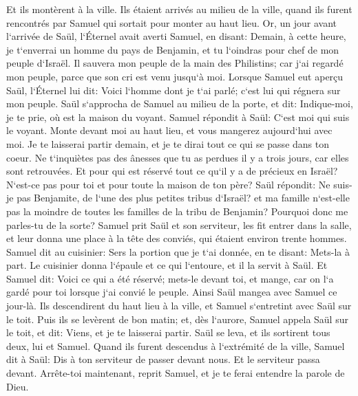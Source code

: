 \verse Et ils montèrent à la ville. Ils étaient arrivés au milieu de la ville, quand ils furent rencontrés par Samuel qui sortait pour monter au haut lieu. 
\verse Or, un jour avant l`arrivée de Saül, l`Éternel avait averti Samuel, en disant: 
\verse Demain, à cette heure, je t`enverrai un homme du pays de Benjamin, et tu l`oindras pour chef de mon peuple d`Israël. Il sauvera mon peuple de la main des Philistins; car j`ai regardé mon peuple, parce que son cri est venu jusqu`à moi. 
\verse Lorsque Samuel eut aperçu Saül, l`Éternel lui dit: Voici l`homme dont je t`ai parlé; c`est lui qui régnera sur mon peuple. 
\verse Saül s`approcha de Samuel au milieu de la porte, et dit: Indique-moi, je te prie, où est la maison du voyant. 
\verse Samuel répondit à Saül: C`est moi qui suis le voyant. Monte devant moi au haut lieu, et vous mangerez aujourd`hui avec moi. Je te laisserai partir demain, et je te dirai tout ce qui se passe dans ton coeur. 
\verse Ne t`inquiètes pas des ânesses que tu as perdues il y a trois jours, car elles sont retrouvées. Et pour qui est réservé tout ce qu`il y a de précieux en Israël? N`est-ce pas pour toi et pour toute la maison de ton père? 
\verse Saül répondit: Ne suis-je pas Benjamite, de l`une des plus petites tribus d`Israël? et ma famille n`est-elle pas la moindre de toutes les familles de la tribu de Benjamin? Pourquoi donc me parles-tu de la sorte? 
\verse Samuel prit Saül et son serviteur, les fit entrer dans la salle, et leur donna une place à la tête des conviés, qui étaient environ trente hommes. 
\verse Samuel dit au cuisinier: Sers la portion que je t`ai donnée, en te disant: Mets-la à part. 
\verse Le cuisinier donna l`épaule et ce qui l`entoure, et il la servit à Saül. Et Samuel dit: Voici ce qui a été réservé; mets-le devant toi, et mange, car on l`a gardé pour toi lorsque j`ai convié le peuple. Ainsi Saül mangea avec Samuel ce jour-là. 
\verse Ils descendirent du haut lieu à la ville, et Samuel s`entretint avec Saül sur le toit. 
\verse Puis ils se levèrent de bon matin; et, dès l`aurore, Samuel appela Saül sur le toit, et dit: Viens, et je te laisserai partir. Saül se leva, et ils sortirent tous deux, lui et Samuel. 
\verse Quand ils furent descendus à l`extrémité de la ville, Samuel dit à Saül: Dis à ton serviteur de passer devant nous. Et le serviteur passa devant. Arrête-toi maintenant, reprit Samuel, et je te ferai entendre la parole de Dieu. 

\chapter{}

